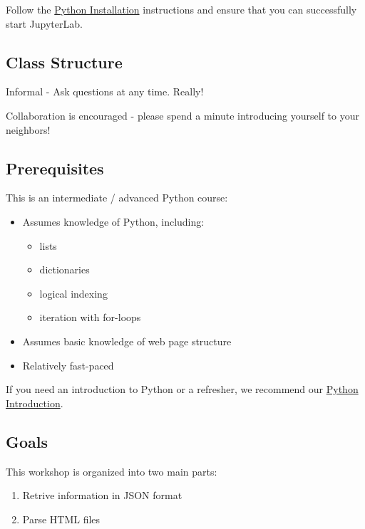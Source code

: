 \documentclass[]{book}
\providecommand{\tightlist}{%
  \setlength{\itemsep}{0pt}\setlength{\parskip}{0pt}}
\begin{document}
Follow the \href{./PythonInstall.html}{Python Installation} instructions and ensure that you can successfully start JupyterLab.

\hypertarget{class-structure-5}{%
\subsection{Class Structure}\label{class-structure-5}}

Informal - Ask questions at any time. Really!

Collaboration is encouraged - please spend a minute introducing yourself to your neighbors!

\hypertarget{prerequisites-5}{%
\subsection{Prerequisites}\label{prerequisites-5}}

This is an intermediate / advanced Python course:

\begin{itemize}
\tightlist
\item
  Assumes knowledge of Python, including:

  \begin{itemize}
  \tightlist
  \item
    lists
  \item
    dictionaries
  \item
    logical indexing
  \item
    iteration with for-loops
  \end{itemize}
\item
  Assumes basic knowledge of web page structure
\item
  Relatively fast-paced
\end{itemize}

If you need an introduction to Python or a refresher, we recommend our \href{https://iqss.github.io/dss-workshops/PythonIntro.html}{Python Introduction}.

\hypertarget{goals-4}{%
\subsection{Goals}\label{goals-4}}

This workshop is organized into two main parts:

\begin{enumerate}
\def\labelenumi{\arabic{enumi}.}
\tightlist
\item
  Retrive information in JSON format
\item
  Parse HTML files
\end{enumerate}
\end{document}
